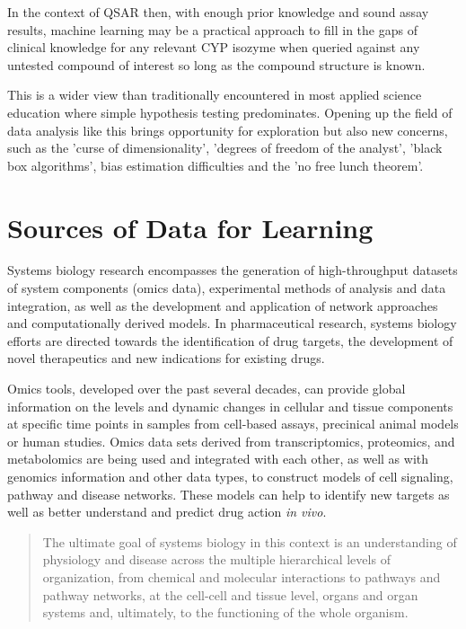 In the context of QSAR then, with enough prior knowledge and sound assay results, machine learning may be a practical approach to fill in the gaps of clinical knowledge for any relevant CYP isozyme when queried against any untested compound of interest so long as the compound structure is known.

This is a wider view than traditionally encountered in most applied science education where simple hypothesis testing predominates. Opening up the field of data analysis like this brings opportunity for exploration but also new concerns, such as the 'curse of dimensionality', 'degrees of freedom of the analyst', 'black box algorithms', bias estimation difficulties and the 'no free lunch theorem'. \cite{Boulesteix2014}

\section{Sources of Data for Learning}

Systems biology research encompasses the generation of high-throughput datasets of system components (omics data), experimental methods of analysis and data integration, as well as the development and application of network approaches and computationally derived models. In pharmaceutical research, systems biology efforts are directed towards the identification of drug targets, the development of novel therapeutics and new indications for existing drugs. \cite{Berg2014}

Omics tools, developed over the past several decades, can provide global information on the levels and dynamic changes in cellular and tissue components at specific time points in samples from cell-based assays, precinical animal models or human studies. Omics data sets derived from transcriptomics, proteomics, and metabolomics are being used and integrated with each other, as well as with genomics information and other data types, to construct models of cell signaling, pathway and disease networks. These models can help to identify new targets as well as better understand and predict drug action \textit{in vivo}.

\begin{quote}
The ultimate goal of systems biology in this context is an understanding of physiology and disease across the multiple hierarchical levels of organization, from chemical and molecular interactions to pathways and pathway networks, at the cell-cell and tissue level, organs and organ systems and, ultimately, to the functioning of the whole organism. \cite{Berg2014}
\end{quote}

